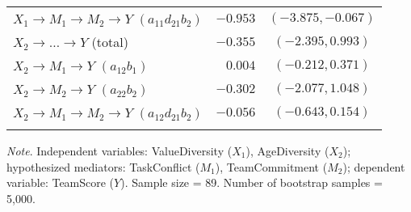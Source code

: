 \documentclass{article}\usepackage[]{graphicx}\usepackage[]{xcolor}
\begin{document}
\begin{table}[h!]
\begin{center}
\begin{tabular}{lrrrr}
$X_{1} \rightarrow M_{1} \rightarrow M_{2} \rightarrow Y$ $(a_{11}d_{21}b_{2})$ & $-0.953$ & \multicolumn{3}{c}{$(-3.875, -0.067)$} \\ 
$X_{2} \rightarrow  \ldots  \rightarrow Y$ (total) & $-0.355$ & \multicolumn{3}{c}{$(-2.395, 0.993)$} \\ 
$X_{2} \rightarrow M_{1} \rightarrow Y$ $(a_{12}b_{1})$ & $0.004$ & \multicolumn{3}{c}{$(-0.212, 0.371)$} \\ 
$X_{2} \rightarrow M_{2} \rightarrow Y$ $(a_{22}b_{2})$ & $-0.302$ & \multicolumn{3}{c}{$(-2.077, 1.048)$} \\ 
$X_{2} \rightarrow M_{1} \rightarrow M_{2} \rightarrow Y$ $(a_{12}d_{21}b_{2})$ & $-0.056$ & \multicolumn{3}{c}{$(-0.643, 0.154)$} \\ 
\noalign{\smallskip}\hline
\end{tabular}
\end{center}
\emph{Note}. Independent variables: ValueDiversity ($X_{1}$), AgeDiversity ($X_{2}$); hypothesized mediators: TaskConflict ($M_{1}$), TeamCommitment ($M_{2}$); dependent variable: TeamScore ($Y$). Sample size = 89. Number of bootstrap samples = 5,000. 

\end{table}
\end{document}
